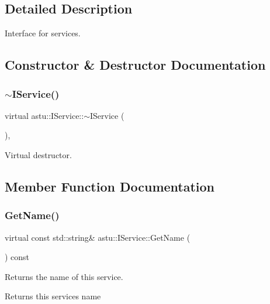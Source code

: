 \subsection{Detailed Description}
Interface for services. 

\subsection{Constructor \& Destructor Documentation}
\mbox{\label{classastu_1_1IService_abf42fedf905da617ad881d3fd28a9d7e}} 
\subsubsection{\texorpdfstring{$\sim$\+I\+Service()}{~IService()}}
{\footnotesize\ttfamily virtual astu\+::\+I\+Service\+::$\sim$\+I\+Service (\begin{DoxyParamCaption}{ }\end{DoxyParamCaption})\hspace{0.3cm}{\ttfamily [inline]}, {\ttfamily [virtual]}}

Virtual destructor. 

\subsection{Member Function Documentation}
\mbox{\label{classastu_1_1IService_a7bfb508c07816c701ceaa72928213380}} 
\subsubsection{\texorpdfstring{Get\+Name()}{GetName()}}
{\footnotesize\ttfamily virtual const std\+::string\& astu\+::\+I\+Service\+::\+Get\+Name (\begin{DoxyParamCaption}{ }\end{DoxyParamCaption}) const\hspace{0.3cm}{\ttfamily [pure virtual]}}

Returns the name of this service.

\begin{DoxyReturn}{Returns}
this service\textquotesingle{}s name 
\end{DoxyReturn}


